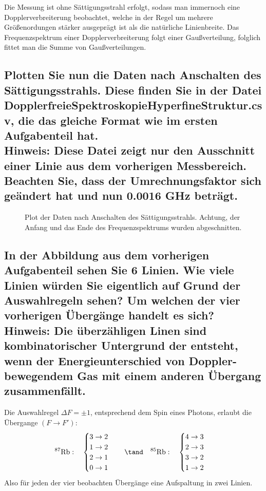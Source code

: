 \documentclass[ex,minted]{exercise_4.1}
\begin{document}
\dottedlinett 

Die Messung ist ohne Sättigungsstrahl erfolgt, sodass man immernoch eine Dopplerverbreiterung beobachtet, welche in der Regel um mehrere Größenordungen stärker ausgeprägt ist als die natürliche Linienbreite. Das Frequenzspektrum einer Dopplerverbreiterung folgt einer Gaußverteilung, folglich fittet man die Summe von Gaußverteilungen. 

\subsection{Plotten Sie nun die Daten nach Anschalten des Sättigungsstrahls. Diese finden Sie in der Datei DopplerfreieSpektroskopieHyperfineStruktur.csv, die das gleiche Format wie im ersten Aufgabenteil hat.\\
Hinweis: Diese Datei zeigt nur den Ausschnitt einer Linie aus dem vorherigen Messbereich. Beachten Sie, dass der Umrechnungsfaktor sich geändert hat und nun 0.0016 GHz beträgt.}

\dottedlinett

\begin{figure}[H]
    \centering
    
    \caption{Plot der Daten nach Anschalten des Sättigungsstrahls. Achtung, der Anfang und das Ende des Frequenzspektrums wurden abgeschnitten.}
\end{figure}

\subsection{In der Abbildung aus dem vorherigen Aufgabenteil sehen Sie 6 Linien. Wie viele Linien würden Sie eigentlich auf Grund der Auswahlregeln sehen? Um welchen der vier vorherigen Übergänge handelt es sich?\\
Hinweis: Die überzähligen Linen sind kombinatorischer Untergrund der entsteht, wenn der Energieunterschied von Doppler-bewegendem Gas mit einem anderen Übergang zusammenfällt.}

\dottedlinett

Die Auswahlregel \(\Delta F = \pm 1\), entsprechend dem Spin eines Photons, erlaubt die Übergange \((F \to F')\):
\begin{align*}
    {}^{87}\mathrm{Rb}:\quad \begin{cases}
        3\to 2\\
        1\to 2\\
        2\to 1\\
        0\to 1\\
    \end{cases}\quad \tand \quad 
    {}^{85}\mathrm{Rb}:\quad \begin{cases}
        4\to 3\\
        2\to 3\\
        3\to 2\\
        1\to 2\\
    \end{cases}
\end{align*}
Also für jeden der vier beobachten Übergänge eine Aufspaltung in zwei Linien. \\
\end{document}
